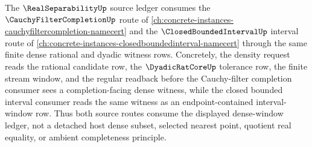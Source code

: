 The $\RealSeparabilityUp$ source ledger consumes the $\CauchyFilterCompletionUp$ route of \autoref{ch:concrete-instances-cauchyfiltercompletion-namecert} and the $\ClosedBoundedIntervalUp$ interval route of \autoref{ch:concrete-instances-closedboundedinterval-namecert} through the same finite dense rational and dyadic witness rows. Concretely, the density request reads the rational candidate row, the $\DyadicRatCoreUp$ tolerance row, the finite stream window, and the regular readback before the Cauchy-filter completion consumer sees a completion-facing dense witness, while the closed bounded interval consumer reads the same witness as an endpoint-contained interval-window row. Thus both source routes consume the displayed dense-window ledger, not a detached host dense subset, selected nearest point, quotient real equality, or ambient completeness principle.
